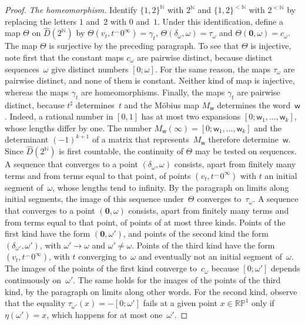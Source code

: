 \documentclass[psamsfonts]{amsart}
\theoremstyle{definition}
\theoremstyle{remark}
\newcommand{\RP}{\mathbb{R}\mathbb{P}}
\numberwithin{equation}{section}
\begin{document}
\begin{proof}
\emph{The homeomorphism.}
Identify $\{1,2\}^{\mathbb{N}}$ with $2^{\mathbb{N}}$ and $\{1,2\}^{<\mathbb{N}}$ with $2^{<\mathbb{N}}$ by replacing the letters $1$ and~$2$ with $0$ and~$1$.
Under this identification, define a map $\Theta$ on $\hat D(2^{\mathbb{N}})$ by $\Theta(v_t,t^\frown0^\infty)=\gamma_t$, $\Theta(\delta_\omega,\omega)=\tau_\omega$ and $\Theta(\mathbf{0},\omega)=c_\omega$.
The map $\Theta$ is surjective by the preceding paragraph.
To see that $\Theta$ is injective, note first that the constant maps $c_\omega$ are pairwise distinct, because distinct sequences~$\omega$ give distinct numbers $[0;\omega]$.
For the same reason, the maps $\tau_\omega$ are pairwise distinct, and none of them is constant.
Neither kind of map is injective, whereas the maps $\gamma_t$ are homeomorphisms.
Finally, the maps $\gamma_t$ are pairwise distinct, because $t^\sharp$ determines~$t$ and the Möbius map $M_{\mathsf{w}}$ determines the word~$\mathsf{w}$.
Indeed, a rational number in $[0,1]$ has at most two expansions $[0;\mathsf{w}_1,\dots,\mathsf{w}_k]$, whose lengths differ by one.
The number $M_{\mathsf{w}}(\infty)=[0;\mathsf{w}_1,\dots,\mathsf{w}_k]$ and the determinant $(-1)^{k+1}$ of a matrix that represents~$M_{\mathsf{w}}$ therefore determine~$\mathsf{w}$.
Since $\hat D(2^{\mathbb{N}})$ is first countable, the continuity of $\Theta$ may be tested on sequences.
A sequence that converges to a point $(\delta_\omega,\omega)$ consists, apart from finitely many terms and from terms equal to that point, of points $(v_t,t^\frown0^\infty)$ with $t$ an initial segment of~$\omega$, whose lengths tend to infinity.
By the paragraph on limits along initial segments, the image of this sequence under~$\Theta$ converges to~$\tau_\omega$.
A sequence that converges to a point $(\mathbf{0},\omega)$ consists, apart from finitely many terms and from terms equal to that point, of points of at most three kinds.
Points of the first kind have the form $(\mathbf{0},\omega')$, and points of the second kind the form $(\delta_{\omega'},\omega')$, with $\omega'\to\omega$ and $\omega'\neq\omega$.
Points of the third kind have the form $(v_t,t^\frown0^\infty)$, with $t$ converging to~$\omega$ and eventually not an initial segment of~$\omega$.
The images of the points of the first kind converge to~$c_\omega$ because $[0;\omega']$ depends continuously on~$\omega'$.
The same holds for the images of the points of the third kind, by the paragraph on limits along other words.
For the second kind, observe that the equality $\tau_{\omega'}(x)=-[0;\omega']$ fails at a given point $x\in\RP^1$ only if $\eta(\omega')=x$, which happens for at most one~$\omega'$.

\end{proof}
\end{document}
